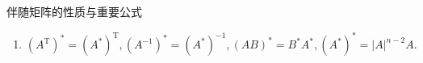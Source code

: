 \documentclass[8pt a4paper,oneside,UTF8]{ctexbook}
\begin{document}
\begin{sloppypar}
\begin{criterion}{伴随矩阵的性质与重要公式}{}
\begin{enumerate}
\begin{itemize}
\begin{proof}
                                $\because A A^*=|A|E \newline \therefore A^{-1}AA^*=A^{-1}|A|E \newline \therefore A^*=|A|A^{-1}$
                            \end{proof}
                      \item $(kA)(kA)^*=|kA|E$\newline
                            以下三个公式都是$AA^*=|A|E$的推广
                      \item $A^{\mathrm{T}}(A^{\mathrm{T}})^{\mathrm{*}}=\left|A^{\mathrm{T}}\right|E$
                      \item $A^{-1}(A^{-1})^*=\left|A^{-1}\right|E$
                      \item $A^*(A^*)^*=\left|A^*\right|E$
                  \end{itemize}
            \item $(A^{\mathrm{T}})^{*}=(A^{*})^{\mathrm{T}},(A^{-1})^{*}=(A^{*})^{-1}, (AB)^{*}=B^{*}A^{*},(A^{*})^{*}=|A|^{n-2}A.$
        \end{enumerate}
    \end{criterion}

\end{sloppypar}
\end{document}
